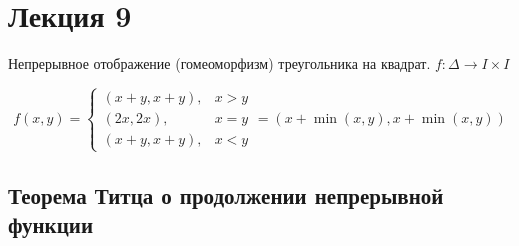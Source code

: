 \section{Лекция 9}

\begin{exercise}
    Непрерывное отображение (гомеоморфизм) треугольника на квадрат.
    $f: \Delta \rightarrow I \times I$

    \[
        f(x, y) =
        \begin{cases}
            (x + y, x + y), & x > y \\
            (2x, 2x), & x = y \\
            (x + y, x + y), & x < y
        \end{cases} = (x + \min{(x, y)}, x + \min{(x, y)})
    \]
\end{exercise}

\subsection{Теорема Титца о продолжении непрерывной функции}


